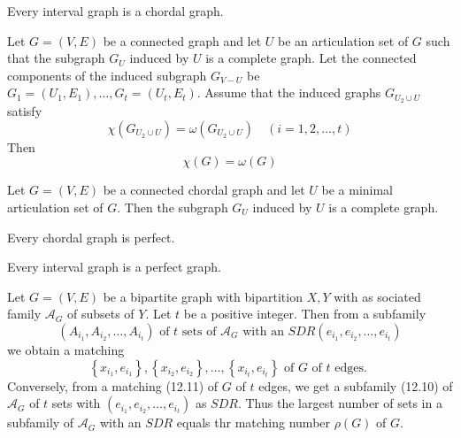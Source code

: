 \begin{theorem}
  \label{thm:12.4.3}
  Every interval graph is a chordal graph.
\end{theorem}

\begin{theorem}
  \label{thm:12.4.4}
  Let $G=(V, E)$ be a connected graph and let $U$ be an articulation set of $G$ such that the subgraph $G_U$ induced by $U$ is a complete graph. Let the connected components of the induced subgraph $G_{V-U}$ be $G_1=\left(U_1, E_1\right), \ldots, G_t=\left(U_t, E_t\right)$. Assume that the induced graphs $G_{U_2 \cup U}$ satisfy
  $$
  \chi\left(G_{U_2 \cup U}\right)=\omega\left(G_{U_2 \cup U}\right) \quad(i=1,2, \ldots, t)
  $$
  Then
  $$
  \chi(G)=\omega(G)
  $$
\end{theorem}

\begin{theorem}
  \label{thm:12.4.5}
  Let $G = (V, E)$ be a connected chordal graph and let $U$ be a minimal articulation set of $G$. Then the subgraph $G_U$ induced by $U$ is a complete graph.
\end{theorem}

\begin{theorem}
  \label{thm:12.4.6}
  Every chordal graph is perfect.
\end{theorem}

\begin{corollary}
  \label{cor:12.4.7}
  Every interval graph is a perfect graph.
\end{corollary}

\begin{theorem}
  \label{thm:12.5.1}
  Let $G=(V, E)$ be a bipartite graph with bipartition $X, Y$ with as sociated family $\mathcal{A}_G$ of subsets of $Y$. Let $t$ be a positive integer. Then from a subfamily
  \begin{equation}\label{12.10}
    \left(A_{i_1}, A_{i_2}, \ldots, A_{i_t}\right) \text { of } t \text { sets of } \mathcal{A}_G \text { with an } S D R\left(e_{i_1}, e_{i_2}, \ldots, e_{i_t}\right)
  \end{equation}
  we obtain a matching
  \begin{equation}\label{12.11}
    \left\{x_{i_1}, e_{i_1}\right\},\left\{x_{i_2}, e_{i_2}\right\}, \ldots,\left\{x_{i_t}, e_{i_t}\right\} \text { of } G \text { of } t \text { edges. }
  \end{equation}
  Conversely, from a matching (12.11) of $G$ of $t$ edges, we get a subfamily (12.10) of $\mathcal{A}_G$ of $t$ sets with $\left(e_{i_1}, e_{i_2}, \ldots, e_{i_t}\right)$ as $S D R$.
  Thus the largest number of sets in a subfamily of $\mathcal{A}_G$ with an $S D R$ equals thr matching number $\rho(G)$ of $G$.
\end{theorem}

